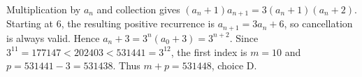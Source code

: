 Multiplication by $a_n$ and collection gives $(a_n+1)a_{n+1}=3(a_n+1)(a_n+2)$. Starting at $6$, the resulting positive recurrence is $a_{n+1}=3a_n+6$, so cancellation is always valid. Hence $a_n+3=3^n(a_0+3)=3^{n+2}$. Since $3^{11}=177147<202403<531441=3^{12}$, the first index is $m=10$ and $p=531441-3=531438$. Thus $\boxed{m+p=531448}$, choice D.
